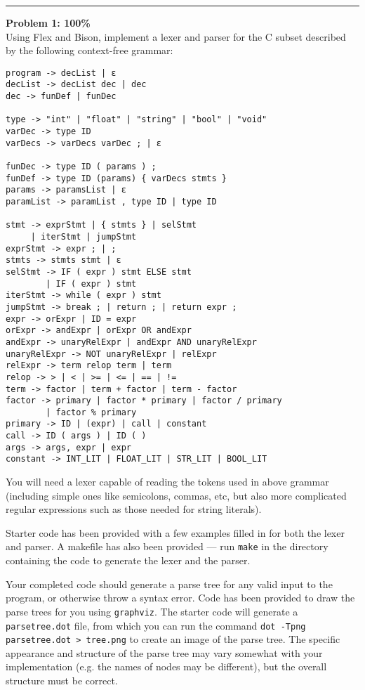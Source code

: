\documentclass[a4paper, 11pt]{article}
\newenvironment{problem}[2][Problem]
    { \begin{mdframed}[backgroundcolor=gray!20] \textbf{#1 #2} \\}
    {  \end{mdframed}}
\begin{document}
\noindent\rule{7in}{2.8pt}
\begin{problem}{1: 100\%}
Using Flex and Bison, implement a lexer and parser for the C subset described by the following context-free grammar:

\begin{verbatim}
program -> decList | ε
decList -> decList dec | dec
dec -> funDef | funDec

type -> "int" | "float" | "string" | "bool" | "void"
varDec -> type ID
varDecs -> varDecs varDec ; | ε

funDec -> type ID ( params ) ;
funDef -> type ID (params) { varDecs stmts }
params -> paramsList | ε
paramList -> paramList , type ID | type ID

stmt -> exprStmt | { stmts } | selStmt
     | iterStmt | jumpStmt
exprStmt -> expr ; | ;
stmts -> stmts stmt | ε
selStmt -> IF ( expr ) stmt ELSE stmt
       	| IF ( expr ) stmt
iterStmt -> while ( expr ) stmt
jumpStmt -> break ; | return ; | return expr ;
expr -> orExpr | ID = expr
orExpr -> andExpr | orExpr OR andExpr
andExpr -> unaryRelExpr | andExpr AND unaryRelExpr
unaryRelExpr -> NOT unaryRelExpr | relExpr
relExpr -> term relop term | term
relop -> > | < | >= | <= | == | !=
term -> factor | term + factor | term - factor
factor -> primary | factor * primary | factor / primary
    	| factor % primary
primary -> ID | (expr) | call | constant
call -> ID ( args ) | ID ( )
args -> args, expr | expr
constant -> INT_LIT | FLOAT_LIT | STR_LIT | BOOL_LIT
\end{verbatim}

You will need a lexer capable of reading the tokens used in above grammar (including simple ones like semicolons, commas, etc, but also more complicated regular expressions such as those needed for string literals).\par
Starter code has been provided with a few examples filled in for both the lexer and parser. A makefile has also been provided --- run \verb|make| in the directory containing the code to generate the lexer and the parser.\par
Your completed code should generate a parse tree for any valid input to the program, or otherwise throw a syntax error. Code has been provided to draw the parse trees for you using \verb|graphviz|. The starter code will generate a \verb|parsetree.dot| file, from which you can run the command \texttt{dot -Tpng parsetree.dot > tree.png} to create an image of the parse tree. The specific appearance and structure of the parse tree may vary somewhat with your implementation (e.g. the names of nodes may be different), but the overall structure must be correct.\par
\end{problem}
\end{document}

